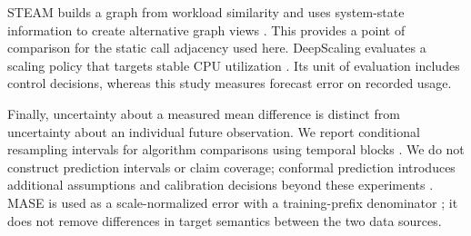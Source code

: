 STEAM builds a graph from workload similarity and uses system-state information to create alternative graph views \cite{steamgraph}. This provides a point of comparison for the static call adjacency used here. DeepScaling evaluates a scaling policy that targets stable CPU utilization \cite{deepscaling}. Its unit of evaluation includes control decisions, whereas this study measures forecast error on recorded usage.

Finally, uncertainty about a measured mean difference is distinct from uncertainty about an individual future observation. We report conditional resampling intervals for algorithm comparisons using temporal blocks \cite{blockbootstrap}. We do not construct prediction intervals or claim coverage; conformal prediction introduces additional assumptions and calibration decisions beyond these experiments \cite{conformal}. MASE is used as a scale-normalized error with a training-prefix denominator \cite{mase}; it does not remove differences in target semantics between the two data sources.

